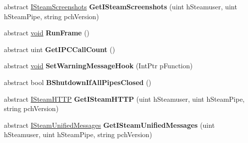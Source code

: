\begin{DoxyCompactItemize}
\item 
\hypertarget{classValve_1_1Steamworks_1_1ISteamClient_aa5b8b625e9aa81b4085d14b1ff49d555}{}abstract \hyperlink{classValve_1_1Steamworks_1_1ISteamScreenshots}{I\+Steam\+Screenshots} {\bfseries Get\+I\+Steam\+Screenshots} (uint h\+Steamuser, uint h\+Steam\+Pipe, string pch\+Version)\label{classValve_1_1Steamworks_1_1ISteamClient_aa5b8b625e9aa81b4085d14b1ff49d555}

\item 
\hypertarget{classValve_1_1Steamworks_1_1ISteamClient_a0c239de472be9d5a81aac502a843eae9}{}abstract \hyperlink{SDL__audio_8h_a52835ae37c4bb905b903cbaf5d04b05f}{void} {\bfseries Run\+Frame} ()\label{classValve_1_1Steamworks_1_1ISteamClient_a0c239de472be9d5a81aac502a843eae9}

\item 
\hypertarget{classValve_1_1Steamworks_1_1ISteamClient_a1afef6a2d0455b007ef868261902db61}{}abstract uint {\bfseries Get\+I\+P\+C\+Call\+Count} ()\label{classValve_1_1Steamworks_1_1ISteamClient_a1afef6a2d0455b007ef868261902db61}

\item 
\hypertarget{classValve_1_1Steamworks_1_1ISteamClient_a9c99caf5ce6e08283e9cda987329cc0e}{}abstract \hyperlink{SDL__audio_8h_a52835ae37c4bb905b903cbaf5d04b05f}{void} {\bfseries Set\+Warning\+Message\+Hook} (Int\+Ptr p\+Function)\label{classValve_1_1Steamworks_1_1ISteamClient_a9c99caf5ce6e08283e9cda987329cc0e}

\item 
\hypertarget{classValve_1_1Steamworks_1_1ISteamClient_af6e8b69ac807f67aa9b01f1fe3dc875d}{}abstract bool {\bfseries B\+Shutdown\+If\+All\+Pipes\+Closed} ()\label{classValve_1_1Steamworks_1_1ISteamClient_af6e8b69ac807f67aa9b01f1fe3dc875d}

\item 
\hypertarget{classValve_1_1Steamworks_1_1ISteamClient_aba1349315dcd3cb8405e48fe11ec40f9}{}abstract \hyperlink{classValve_1_1Steamworks_1_1ISteamHTTP}{I\+Steam\+H\+T\+T\+P} {\bfseries Get\+I\+Steam\+H\+T\+T\+P} (uint h\+Steamuser, uint h\+Steam\+Pipe, string pch\+Version)\label{classValve_1_1Steamworks_1_1ISteamClient_aba1349315dcd3cb8405e48fe11ec40f9}

\item 
\hypertarget{classValve_1_1Steamworks_1_1ISteamClient_af6d0bbf0ff1d355a2cf84620d29ecd4b}{}abstract \hyperlink{classValve_1_1Steamworks_1_1ISteamUnifiedMessages}{I\+Steam\+Unified\+Messages} {\bfseries Get\+I\+Steam\+Unified\+Messages} (uint h\+Steamuser, uint h\+Steam\+Pipe, string pch\+Version)\label{classValve_1_1Steamworks_1_1ISteamClient_af6d0bbf0ff1d355a2cf84620d29ecd4b}


\end{DoxyCompactItemize}
